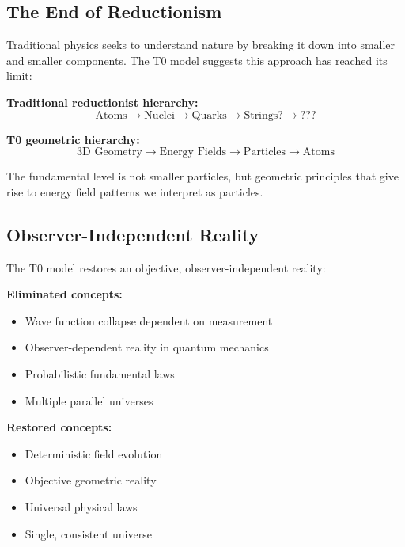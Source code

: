 \documentclass[12pt,a4paper]{report}
\begin{document}
\subsection{The End of Reductionism}
\label{subsec:end_reductionism}

Traditional physics seeks to understand nature by breaking it down into smaller and smaller components. The T0 model suggests this approach has reached its limit:

\textbf{Traditional reductionist hierarchy:}
\begin{equation}
	\text{Atoms} \rightarrow \text{Nuclei} \rightarrow \text{Quarks} \rightarrow \text{Strings?} \rightarrow \text{???}
\end{equation}

\textbf{T0 geometric hierarchy:}
\begin{equation}
	\text{3D Geometry} \rightarrow \text{Energy Fields} \rightarrow \text{Particles} \rightarrow \text{Atoms}
\end{equation}

The fundamental level is not smaller particles, but geometric principles that give rise to energy field patterns we interpret as particles.

\subsection{Observer-Independent Reality}
\label{subsec:observer_independent_reality}

The T0 model restores an objective, observer-independent reality:

\textbf{Eliminated concepts:}
\begin{itemize}
	\item Wave function collapse dependent on measurement
	\item Observer-dependent reality in quantum mechanics
	\item Probabilistic fundamental laws
	\item Multiple parallel universes
\end{itemize}

\textbf{Restored concepts:}
\begin{itemize}
	\item Deterministic field evolution
	\item Objective geometric reality
	\item Universal physical laws
	\item Single, consistent universe
\end{itemize}
\end{document}

